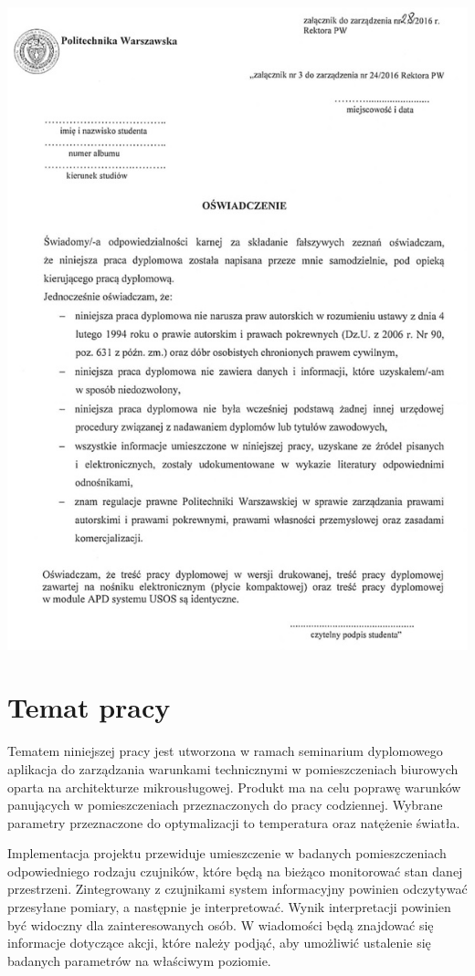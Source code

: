 \documentclass[11pt]{article} %
\begin{document}
\includegraphics[width=1\textwidth]{oswiadczenie_o_samedzielnosci.jpg}

\tableofcontents

\section{Temat pracy}

Tematem niniejszej pracy jest utworzona w ramach seminarium dyplomowego aplikacja do 
zarządzania warunkami technicznymi w pomieszczeniach biurowych oparta na architekturze 
mikrousługowej. Produkt ma na celu poprawę warunków panujących w pomieszczeniach 
przeznaczonych do pracy codziennej. Wybrane parametry przeznaczone do optymalizacji to 
temperatura oraz natężenie światła.

Implementacja projektu przewiduje umieszczenie w badanych pomieszczeniach odpowiedniego 
rodzaju czujników, które będą na bieżąco monitorować stan danej przestrzeni. 
Zintegrowany z czujnikami system informacyjny powinien odczytywać przesyłane 
pomiary, a następnie je interpretować. Wynik interpretacji powinien być widoczny dla 
zainteresowanych osób. W wiadomości będą znajdować się informacje dotyczące 
akcji, które należy podjąć, aby umożliwić ustalenie się badanych parametrów na 
właściwym poziomie.
\end{document}
